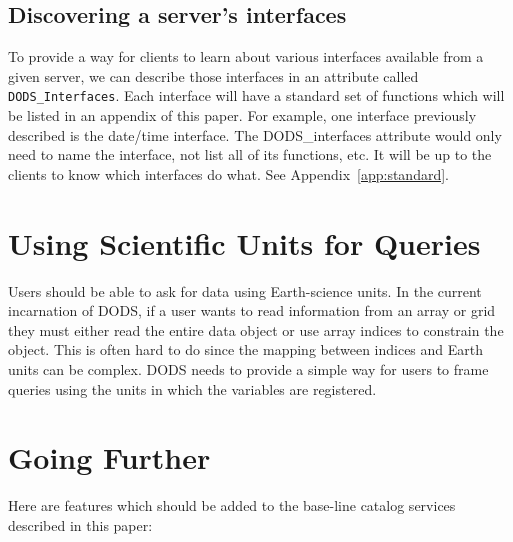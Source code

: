 \documentclass[12pt]{article}
\begin{document}
\subsection{Discovering a server's interfaces}
\label{sec:interfaces}

To provide a way for clients to learn about various interfaces available from
a given server, we can describe those interfaces in an attribute called
{\tt DODS\_Interfaces}. Each interface will have a standard set of
functions which will be listed in an appendix of this paper. For example, one
interface previously described is the date/time interface. The
DODS\_interfaces attribute would only need to name the interface, not list
all of its functions, etc. It will be up to the clients to know which
interfaces do what. See Appendix~\ref{app:standard}.

\section{Using Scientific Units for Queries}

Users should be able to ask for data using Earth-science units. In the
current incarnation of DODS, if a user wants to read information from an
array or grid they must either read the entire data object or use array
indices to constrain the object. This is often hard to do since the mapping
between indices and Earth units can be complex. DODS needs to provide a
simple way for users to frame queries using the units in which the variables
are registered.



\section{Going Further}

Here are features which should be added to the base-line catalog services
described in this paper:
\end{document}
